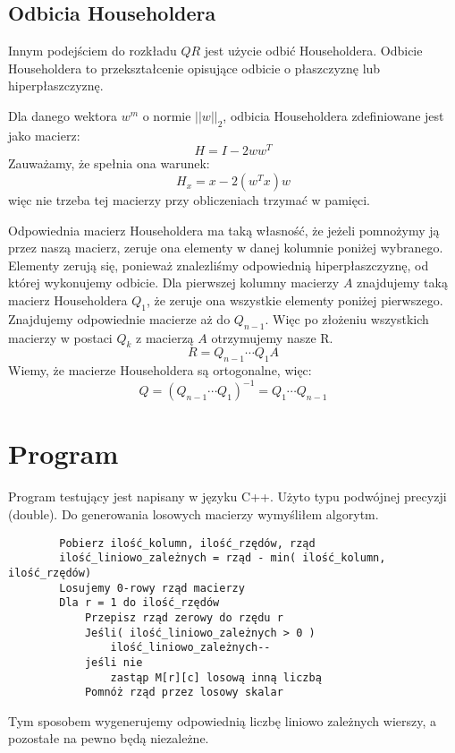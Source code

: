 \documentclass[a4paper,10pt]{article}
\begin{document}
	\subsection{Odbicia Householdera}
		Innym podejściem do rozkładu $QR$ jest użycie odbić Householdera. Odbicie Householdera to przekształcenie opisujące
		odbicie o płaszczyznę lub hiperpłaszczyznę.

		Dla danego wektora $w^m$ o normie $||w||_2$, odbicia Householdera zdefiniowane jest jako macierz:
		\begin{equation}
			H = I - 2ww^T
		\end{equation}
		Zauważamy, że spełnia ona warunek:
		\begin{equation}
			H_x = x - 2(w^Tx)w
		\end{equation}
		więc nie trzeba tej macierzy przy obliczeniach trzymać w pamięci.

		Odpowiednia macierz Householdera ma taką własność, że jeżeli pomnożymy ją przez naszą macierz, zeruje ona elementy w danej kolumnie poniżej wybranego.
		Elementy zerują się, ponieważ znalezliśmy odpowiednią hiperpłaszczyznę, od której wykonujemy odbicie.
		Dla pierwszej kolumny macierzy $A$ znajdujemy taką macierz Householdera $Q_1$, że zeruje ona wszystkie elementy poniżej pierwszego.
		Znajdujemy odpowiednie macierze aż do $Q_{n-1}$. Więc po złożeniu wszystkich macierzy w postaci $Q_k$ z macierzą $A$ otrzymujemy nasze R.
		\begin{equation}
			R = Q_{n-1} \cdots Q_{1} A
		\end{equation}
		Wiemy, że macierze Householdera są ortogonalne, więc:
		\begin{equation}
			Q = (Q_{n-1}\cdots Q_{1})^{-1} = Q_1\cdots Q_{n-1}
		\end{equation}
\section{Program}
	Program testujący jest napisany w języku C++. Użyto typu podwójnej precyzji (double). Do generowania losowych macierzy wymyśliłem algorytm.
	\begin{verbatim}
		Pobierz ilość_kolumn, ilość_rzędów, rząd
		ilość_liniowo_zależnych = rząd - min( ilość_kolumn, ilość_rzędów)
		Losujemy 0-rowy rząd macierzy
		Dla r = 1 do ilość_rzędów
		    Przepisz rząd zerowy do rzędu r
		    Jeśli( ilość_liniowo_zależnych > 0 )
		        ilość_liniowo_zależnych--
		    jeśli nie
		        zastąp M[r][c] losową inną liczbą
		    Pomnóż rząd przez losowy skalar
	\end{verbatim}
	Tym sposobem wygenerujemy odpowiednią liczbę liniowo zależnych wierszy, a pozostałe na pewno będą niezależne.
\end{document}
